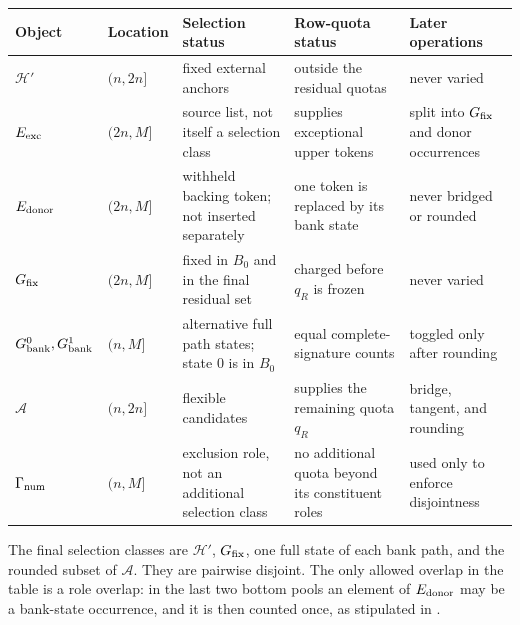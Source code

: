 \documentclass[11pt]{article}
\numberwithin{equation}{section}
\theoremstyle{definition}
\theoremstyle{remark}
\newcommand{\1}{\mathbf 1}
\begin{document}
\begin{center}
\small
\begin{tabular}{@{}>{\raggedright\arraybackslash}p{2.35cm}
 >{\raggedright\arraybackslash}p{2.25cm}
 >{\raggedright\arraybackslash}p{3.05cm}
 >{\raggedright\arraybackslash}p{3.0cm}
 >{\raggedright\arraybackslash}p{3.25cm}@{}}
\toprule
Object & Location & Selection status & Row-quota status & Later operations \\
\midrule
\(\mathcal H'\) & \((n,2n]\) & fixed external anchors & outside the residual quotas & never varied \\
\(E_{\rm exc}\) & \((2n,M]\) & source list, not itself a selection class & supplies exceptional upper tokens & split into \(G_{\rm fix}\) and donor occurrences \\
\(E_{\rm donor}\) & \((2n,M]\) & withheld backing token; not inserted separately & one token is replaced by its bank state & never bridged or rounded \\
\(G_{\rm fix}\) & \((2n,M]\) & fixed in \(B_0\) and in the final residual set & charged before \(q_R\) is frozen & never varied \\
\(G_{\rm bank}^0,G_{\rm bank}^1\) & \((n,M]\) & alternative full path states; state \(0\) is in \(B_0\) & equal complete-signature counts & toggled only after rounding \\
\(\mathcal A\) & \((n,2n]\) & flexible candidates & supplies the remaining quota \(q_R\) & bridge, tangent, and rounding \\
\(\Gamma_{\rm num}\) & \((n,M]\) & exclusion role, not an additional selection class & no additional quota beyond its constituent roles & used only to enforce disjointness \\
\bottomrule
\end{tabular}
\end{center}

The final selection classes are
\(\mathcal H'\), \(G_{\rm fix}\), one full state of each bank path, and
the rounded subset of \(\mathcal A\).  They are pairwise disjoint.  The
only allowed overlap in the table is a role overlap: in the last two
bottom pools an element of \(E_{\rm donor}\) may be a bank-state
occurrence, and it is then counted once, as stipulated in
.
\end{document}

